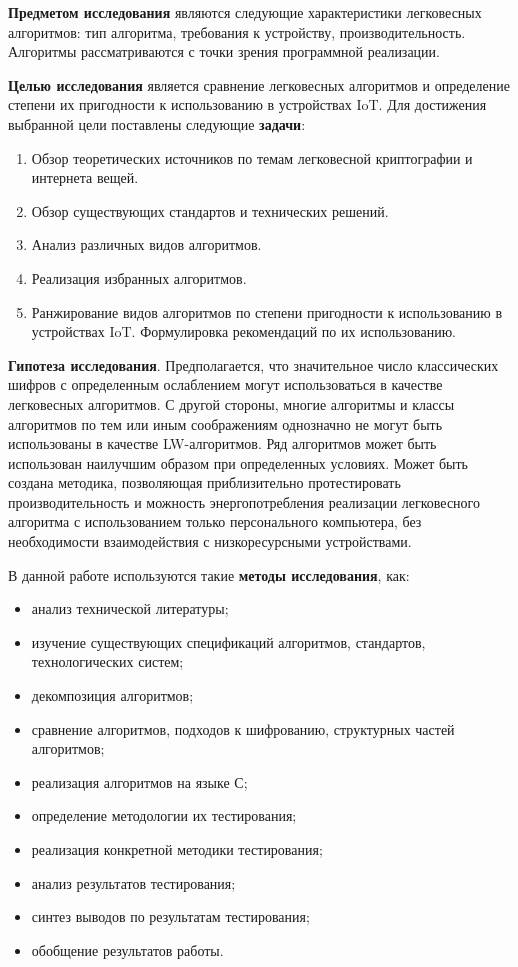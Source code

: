 \textbf{Предметом исследования} являются следующие характеристики легковесных алгоритмов: тип алгоритма, требования к устройству, производительность. Алгоритмы рассматриваются с точки зрения программной реализации.

\textbf{Целью исследования} является сравнение легковесных алгоритмов и определение степени их пригодности к использованию в устройствах IoT. Для достижения выбранной цели поставлены следующие \textbf{задачи}:
\begin{enumerate}
	\item Обзор теоретических источников по темам легковесной криптографии и интернета вещей.
	\item Обзор существующих стандартов и технических решений.
	\item Анализ различных видов алгоритмов.
	\item Реализация избранных алгоритмов.
	\item Ранжирование видов алгоритмов по степени пригодности к использованию в устройствах IoT. Формулировка рекомендаций по их использованию.
\end{enumerate} 

\textbf{Гипотеза исследования}. Предполагается, что значительное число классических шифров с определенным ослаблением могут использоваться в качестве легковесных алгоритмов. С другой стороны, многие алгоритмы и классы алгоритмов по тем или иным соображениям однозначно не могут быть использованы в качестве LW-алгоритмов. Ряд алгоритмов может быть использован наилучшим образом при определенных условиях. Может быть создана методика, позволяющая приблизительно протестировать производительность и можность энергопотребления реализации легковесного алгоритма с использованием только персонального компьютера, без необходимости взаимодействия с низкоресурсными устройствами.

В данной работе используются такие \textbf{методы исследования}, как:
\begin{itemize}
	\item анализ технической литературы;
	\item изучение существующих спецификаций алгоритмов, стандартов, технологических систем;
	\item декомпозиция алгоритмов;
	\item сравнение алгоритмов, подходов к шифрованию, структурных частей алгоритмов;
	\item реализация алгоритмов на языке С;
	\item определение методологии их тестирования;
	\item реализация конкретной методики тестирования;
	\item анализ результатов тестирования;
	\item синтез выводов по результатам тестирования;
	\item обобщение результатов работы.
\end{itemize}  

